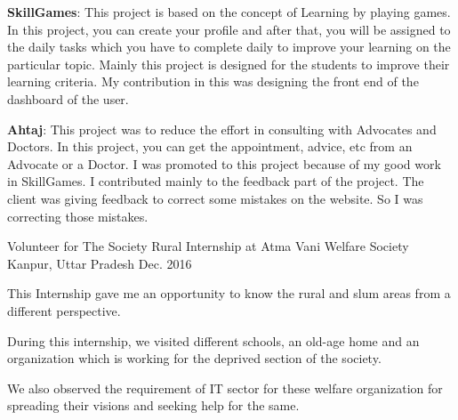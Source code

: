 \begin{cventries}
{\begin{cvitems}
        \item {\textbf{SkillGames}: This project is based on the concept of Learning by playing games. In this project, you can create your profile and after that, you will be assigned to the daily tasks which you have to complete daily to improve your learning on the particular topic. Mainly this project is designed for the students to improve their learning criteria. My contribution in this was designing the front end of the dashboard of the user.}
        \item {\textbf{Ahtaj}: This project was to reduce the effort in consulting with Advocates and Doctors. In this project, you can get the appointment, advice, etc from an Advocate or a Doctor. I was promoted to this project because of my good work in SkillGames. I contributed mainly to the feedback part of the project. The client was giving feedback to correct some mistakes on the website. So I was correcting those mistakes.}
      \end{cvitems}
    }
    
  \cventry
    {Volunteer for The Society}
    {Rural Internship at Atma Vani Welfare Society}
    {Kanpur, Uttar Pradesh}
    {Dec. 2016}
    {
      \begin{cvitems}
        \item {This Internship gave me an opportunity to know the rural and slum areas from a different perspective.} 
        \item{During this internship, we visited different schools, an old-age home and an organization which is working for the deprived section of the society.}
        \item {We also observed the requirement of IT sector for these welfare organization for spreading their visions and seeking help for the same.} 
      \end{cvitems} 
    }
  
\end{cventries}
